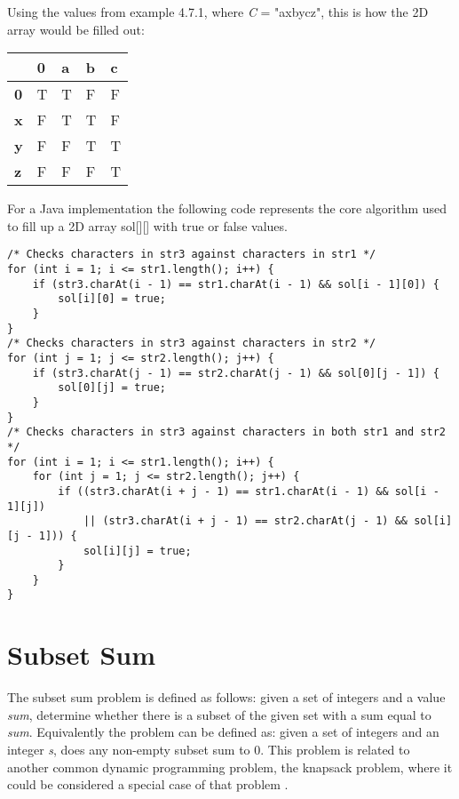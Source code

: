 \smallbreak\noindent
Using the values from example 4.7.1, where \textit{C} = "axbycz", this is how the 2D array would be filled out:
\begin{table}[h]
	\centering
	\begin{tabular}{|l|l|l|l|l|}
		\hline
		& \textbf{0} & \textbf{a} & \textbf{b} & \textbf{c} \\ \hline
		\textbf{0} & T & T & F & F \\ \hline
		\textbf{x} & F & T & T & F \\ \hline
		\textbf{y} & F & F & T & T \\ \hline
		\textbf{z} & F & F & F & T \\ \hline
	\end{tabular}
\end{table}

\smallbreak\noindent
For a Java implementation the following code represents the core algorithm used to fill up a 2D array sol[][] with true or false values.

\begin{lstlisting}
/* Checks characters in str3 against characters in str1 */
for (int i = 1; i <= str1.length(); i++) {
	if (str3.charAt(i - 1) == str1.charAt(i - 1) && sol[i - 1][0]) {
		sol[i][0] = true;
	}
}
/* Checks characters in str3 against characters in str2 */
for (int j = 1; j <= str2.length(); j++) {
	if (str3.charAt(j - 1) == str2.charAt(j - 1) && sol[0][j - 1]) {
		sol[0][j] = true;
	}
}
/* Checks characters in str3 against characters in both str1 and str2 */
for (int i = 1; i <= str1.length(); i++) {
	for (int j = 1; j <= str2.length(); j++) {
		if ((str3.charAt(i + j - 1) == str1.charAt(i - 1) && sol[i - 1][j]) 
			|| (str3.charAt(i + j - 1) == str2.charAt(j - 1) && sol[i][j - 1])) {
			sol[i][j] = true;
		}
	}
}
\end{lstlisting}

\section{Subset Sum}
The subset sum problem is defined as follows: given a set of integers and a value \textit{sum}, determine whether there is a subset of the given set with a sum equal to \textit{sum}. Equivalently the problem can be defined as: given a set of integers and an integer \textit{s}, does any non-empty subset sum to 0. This problem is related to another common dynamic programming problem, the knapsack problem, where it could be considered a special case of that problem \cite{knapsack-book}.

